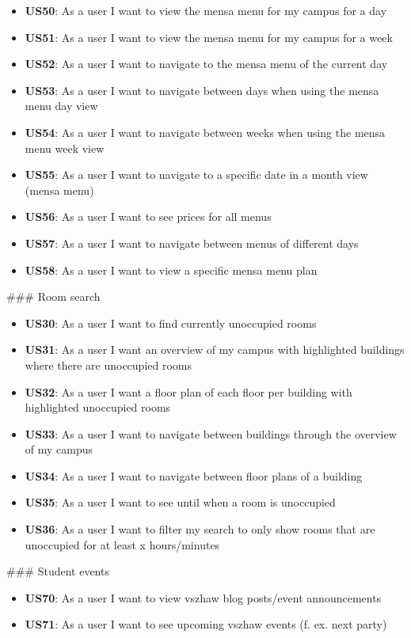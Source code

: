\begin{markdown}
\begin{itemize}
  \item \textbf{US50}: As a user I want to view the mensa menu for my campus for a day
  \item \textbf{US51}: As a user I want to view the mensa menu for my campus for a week
  \item \textbf{US52}: As a user I want to navigate to the mensa menu of the current day
  \item \textbf{US53}: As a user I want to navigate between days when using the mensa menu day view
  \item \textbf{US54}: As a user I want to navigate between weeks when using the mensa menu week view
  \item \textbf{US55}: As a user I want to navigate to a specific date in a month view (mensa menu)
  \item \textbf{US56}: As a user I want to see prices for all menus
  \item \textbf{US57}: As a user I want to navigate between menus of different days
  \item \textbf{US58}: As a user I want to view a specific mensa menu plan
\end{itemize}

### Room search

\begin{itemize}
  \item \textbf{US30}: As a user I want to find currently unoccupied rooms
  \item \textbf{US31}: As a user I want an overview of my campus with highlighted buildings where there are unoccupied rooms
  \item \textbf{US32}: As a user I want a floor plan of each floor per building with highlighted unoccupied rooms
  \item \textbf{US33}: As a user I want to navigate between buildings through the overview of my campus
  \item \textbf{US34}: As a user I want to navigate between floor plans of a building
  \item \textbf{US35}: As a user I want to see until when a room is unoccupied
  \item \textbf{US36}: As a user I want to filter my search to only show rooms that are unoccupied for at least x hours/minutes
\end{itemize}

### Student events

\begin{itemize}
  \item \textbf{US70}: As a user I want to view vszhaw blog posts/event announcements
  \item \textbf{US71}: As a user I want to see upcoming vszhaw events (f. ex. next party)
\end{itemize}

\end{markdown}

